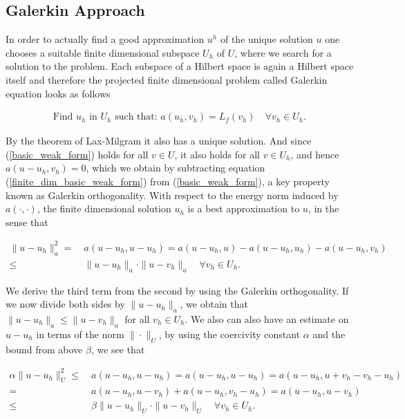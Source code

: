\documentclass[../draft_1.tex]{subfiles}
\begin{document}
\subsection{Galerkin Approach}
In order to actually find a good approximation $u^h$ of the unique solution $u$ one chooses a suitable finite dimensional subspace $U_h$ of $U$, where we search for a solution to the problem. Each subspace of a Hilbert space is again a Hilbert space itself and therefore the projected finite dimensional problem called Galerkin equation looks as follows
\begin{ceqn}
\begin{equation}
\begin{aligned}
\label{finite_dim_basic_weak_form}
\text{Find } u_h \text{ in } U_h \text{ such that:  } a(u_h, v_h) = L_f(v_h) \quad \forall v_h \in U_h.
\end{aligned}
\end{equation}
\end{ceqn}
By the theorem of Lax-Milgram it also has a unique solution. And since (\ref{basic_weak_form}) holds for all $v \in U$, it also holds for all $v \in U_h$, and hence $a(u-u_h, v_h) = 0$, which we obtain by subtracting equation (\ref{finite_dim_basic_weak_form}) from (\ref{basic_weak_form}), a key property known as Galerkin orthogonality. With respect to the energy norm induced by $a(\cdot, \cdot)$, the finite dimensional solution $u_h$ is a best approximation to $u$, in the sense that 
\begin{ceqn}
\begin{equation}
\begin{aligned}
\| u - u_h \|_a^2 =& \ a(u-u_h, u-u_h) = a(u-u_h, u) - a(u-u_h, u_h) - a(u-u_h, v_h) \\
\leq& \ \|u - u_h \|_a \cdot \| u - v_h \|_a \quad \forall v_h \in U_h.
\end{aligned}
\end{equation}
\end{ceqn}
We derive the third term from the second by using the Galerkin orthogonality. If we now divide both sides by $\| u - u_h\|_a$, we obtain that $\| u - u_h \|_a \leq \| u -v_h\|_a$ for all $v_h \in U_h$. We also can also have an estimate on $u - u_h$ in terms of the norm $\| \cdot \|_U$, by using the coercivity constant $\alpha$ and the bound from above $\beta$, we see that
\begin{ceqn}
\begin{equation}
\begin{aligned}
\label{approx_property}
\alpha \| u - u_h \|_U^2 \leq& \ a(u-u_h, u-u_h) = a(u-u_h, u- u_h) = a(u-u_h, u +v_h - v_h - u_h ) \\
=& \ a(u-u_h, u - v_h) + a(u - u_h, v_h - u_h) = a(u-u_h, u - v_h) \\
\leq& \ \beta \| u - u_h \|_U \cdot \| u - v_h\|_U  \quad \forall v_h \in U_h.
\end{aligned}
\end{equation}
\end{ceqn}
\end{document}
